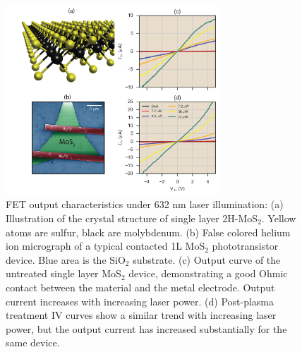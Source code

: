 \documentclass[%
 reprint,
superscriptaddress,
 amsmath,amssymb,
 aps,
prb,
]{revtex4-1}
\begin{document}
\begin{center}
\begin{figure}[!htb]
\includegraphics[width=80mm]{Fig_1}
\caption{FET output characteristics under 632 nm laser illumination: (a) Illustration of the crystal structure of single layer 2H-MoS$_2$. Yellow atoms are sulfur, black are molybdenum. (b) False colored helium ion micrograph of a typical contacted 1L MoS$_2$ phototransistor device. Blue area is the SiO$_2$ substrate. (c) Output curve of the untreated single layer MoS$_2$ device, demonstrating a good Ohmic contact between the material and the metal electrode. Output current increases with increasing laser power. (d) Post-plasma treatment IV curves show a similar trend with increasing laser power, but the output current has increased substantially for the same device. }
\end{figure}
\end{center}
\end{document}
